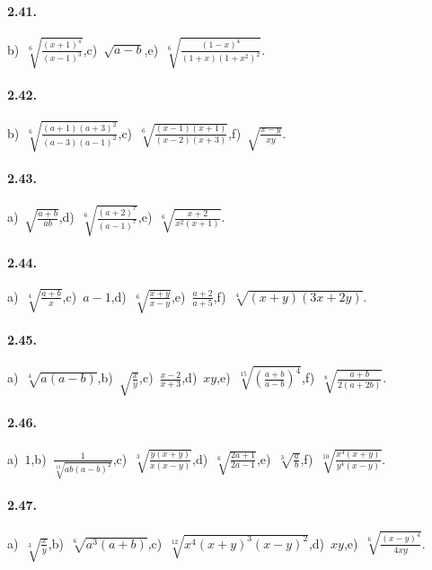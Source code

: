 \paragraph{2.41.}
b)~$\sqrt[6]{\frac{(x+1)^4}{(x-1)^3}}$,\quad c)~$\sqrt{a-b}$,\quad e)~$\sqrt[6]{\frac{(1-x)^4}{(1+x)(1+x^2)^2}}$.

\paragraph{2.42.}
b)~$\sqrt[6]{\frac{(a+1)(a+3)^2}{(a-3)(a-1)^2}}$,\quad c)~$\sqrt[6]{\frac{(x-1)(x+1)}{(x-2)(x+3)}}$,\quad f)~$\sqrt{\frac{x-y}{xy}}$.

\paragraph{2.43.}
a)~$\sqrt{\frac{a+b}{ab}}$,\quad d)~$\sqrt[6]{\frac{(a+2)^7}{(a-1)^7}}$,\quad e)~$\sqrt[6]{\frac{x+2}{x^2(x+1)}}$.

\paragraph{2.44.}
a)~$\sqrt[4]{\frac{a+b} x}$,\quad c)~$a-1$,\quad d)~$\sqrt[6]{\frac{x+y}{x-y}}$,\quad e)~$\frac{a+2}{a+5}$,\quad f)~$\sqrt[4]{(x+y)(3x+2y)}$.

\paragraph{2.45.}
a)~$\sqrt[4]{a(a-b)}$,\quad b)~$\sqrt{\frac{x}{y}}$,\quad c)~$\frac{x-2}{x+3}$,\quad d)~$xy$,\quad e)~$\sqrt[15]{\left(\frac{a+b}{a-b}\right)^4}$,\quad f)~$\sqrt[8]{\frac{a+b}{2(a+2b)}}$.

\paragraph{2.46.}
a)~$1$,\quad b)~$\frac{1}{\sqrt[12]{ab(a-b)^2}}$,\quad c)~$\sqrt[3]{\frac{y(x+y)}{x(x-y)}}$,\quad d)~$\sqrt[6]{\frac{2a+1}{2a-1}}$,\quad e)~$\sqrt[3]{\frac{a}{b}}$,\quad f)~$\sqrt[10]{\frac{x^4(x+y)}{y^4(x-y)}}$.

\paragraph{2.47.}
a)~$\sqrt[3]{\frac{x}{y}}$,\quad b)~$\sqrt[6]{a^3(a+b)}$,\quad c)~$\sqrt[12]{x^4(x+y)^3(x-y)^2}$,\quad d)~$xy$,\quad e)~$\sqrt[6]{\frac{(x-y)^4}{4xy}}$. %

